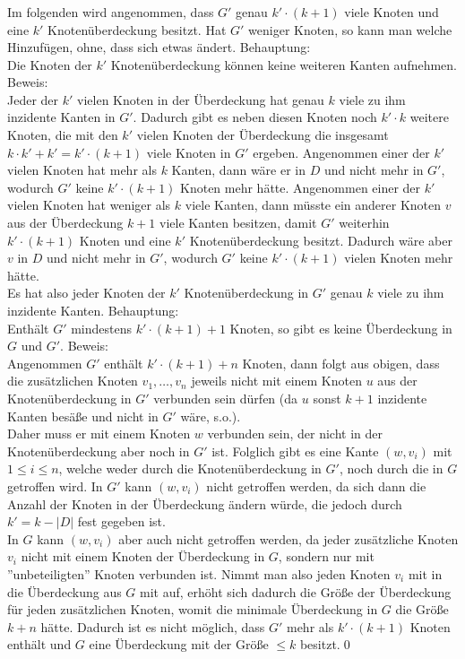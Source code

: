 \documentclass[a4paper]{article}
\begin{document}
		\subsubsection{}
			Im folgenden wird angenommen, dass $G'$ genau $k'\cdot(k+1)$ viele Knoten und eine $k'$ Knotenüberdeckung besitzt. 
			Hat $G'$ weniger Knoten, so kann man welche Hinzufügen, ohne, dass sich etwas ändert.\n
			Behauptung:\\
			Die Knoten der $k'$ Knotenüberdeckung können keine weiteren Kanten aufnehmen.\n
			Beweis:\\
			Jeder der $k'$ vielen Knoten in der Überdeckung hat genau $k$ viele zu ihm inzidente Kanten in $G'$.
			Dadurch gibt es neben diesen Knoten noch $k'\cdot k$ weitere Knoten, die mit den $k'$ vielen Knoten der Überdeckung die insgesamt $k\cdot k'+k'=k'\cdot (k+1)$ viele Knoten in $G'$ ergeben.\n
			Angenommen einer der $k'$ vielen Knoten hat mehr als $k$ Kanten, dann wäre er in $D$ und nicht mehr in $G'$, wodurch $G'$ keine $k'\cdot(k+1)$ Knoten mehr hätte.
			Angenommen einer der $k'$ vielen Knoten hat weniger als $k$ viele Kanten, dann müsste ein anderer Knoten $v$ aus der Überdeckung $k+1$ viele Kanten besitzen, damit $G'$ weiterhin $k'\cdot (k+1)$ Knoten und eine $k'$ Knotenüberdeckung besitzt.
			Dadurch wäre aber $v$ in $D$ und nicht mehr in $G'$, wodurch $G'$ keine $k'\cdot(k+1)$ vielen Knoten mehr hätte.\\
			Es hat also jeder Knoten der $k'$ Knotenüberdeckung in $G'$ genau $k$ viele zu ihm inzidente Kanten.\n
			Behauptung:\\
			Enthält $G'$ mindestens $k'\cdot(k+1)+1$ Knoten, so gibt es keine Überdeckung in $G$ und $G'$.\n
			Beweis:\\
			Angenommen $G'$ enthält $k'\cdot(k+1)+n$ Knoten, dann folgt aus obigen, dass die zusätzlichen Knoten $v_1,\dots,v_n$ jeweils nicht mit einem Knoten $u$ aus der Knotenüberdeckung in $G'$ verbunden sein dürfen (da $u$ sonst $k+1$ inzidente Kanten besäße und nicht in $G'$ wäre, s.o.).\\
			Daher muss er mit einem Knoten $w$ verbunden sein, der nicht in der Knotenüberdeckung aber noch in $G'$  ist.
			Folglich gibt es eine Kante $(w, v_i)$ mit $1\leq i\leq n$, welche weder durch die Knotenüberdeckung in $G'$, noch durch die in $G$ getroffen wird.\n
			In $G'$ kann $(w,v_i)$ nicht getroffen werden, da sich dann die Anzahl der Knoten in der Überdeckung ändern würde, die jedoch durch $k'=k-|D|$ fest gegeben ist.\\
			In $G$ kann $(w, v_i)$ aber auch nicht getroffen werden, da jeder zusätzliche Knoten $v_i$ nicht mit einem Knoten der Überdeckung in $G$, sondern nur mit ''unbeteiligten'' Knoten verbunden ist. Nimmt man also jeden Knoten $v_i$ mit in die Überdeckung aus $G$ mit auf, erhöht sich dadurch die Größe der Überdeckung für jeden zusätzlichen Knoten, womit die minimale Überdeckung in $G$ die Größe $k+n$ hätte.\n
			Dadurch ist es nicht möglich, dass $G'$ mehr als $k'\cdot(k+1)$ Knoten enthält und $G$ eine Überdeckung mit der Größe $\leq k$ besitzt.\qed
\end{document}
